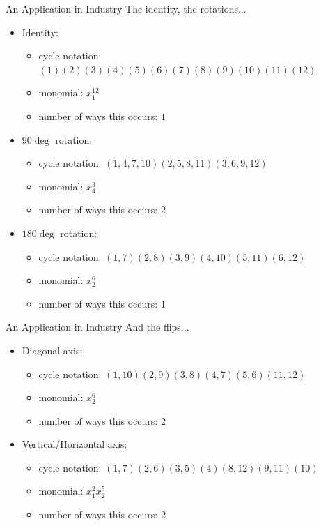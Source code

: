 \documentclass{beamer}
\begin{document}
\begin{frame}{An Application in Industry}
The identity, the rotations...
\begin{itemize}
	\item Identity:
    	\begin{itemize}
    	\item cycle notation: $(1)(2)(3)(4)(5)(6)(7)(8)(9)(10)(11)(12)$
    	\item monomial: $x_1^{12}$
    	\item number of ways this occurs: $1$
    	\end{itemize}
    \item $90\deg$ rotation:
    	\begin{itemize}
    	\item cycle notation: $(1,4,7,10)(2,5,8,11)(3,6,9,12)$
    	\item monomial: $x_4^{3}$
    	\item number of ways this occurs: $2$
    	\end{itemize}
    \item $180\deg$ rotation:
    	\begin{itemize}
    	\item cycle notation: $(1,7)(2,8)(3,9)(4,10)(5,11)(6,12)$
    	\item monomial: $x_2^{6}$
    	\item number of ways this occurs: $1$
    	\end{itemize}
\end{itemize}
\end{frame}

\begin{frame}{An Application in Industry}
And the flips...
\begin{itemize}
\item Diagonal axis:
    	\begin{itemize}
    	\item cycle notation: $(1,10)(2,9)(3,8)(4,7)(5,6)(11,12)$
    	\item monomial: $x_2^{6}$
    	\item number of ways this occurs: $2$
    	\end{itemize}
\item Vertical/Horizontal axis:
    	\begin{itemize}
    	\item cycle notation: $(1,7)(2,6)(3,5)(4)(8,12)(9,11)(10)$
    	\item monomial: $x_1^{2} x_2^5$
    	\item number of ways this occurs: $2$
    	\end{itemize}
\end{itemize}
\end{frame}
\end{document}
